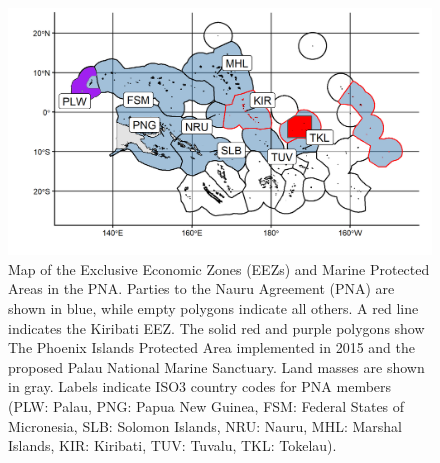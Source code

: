 \documentclass[12pt]{article}
\begin{document}
\begin{figure}
\centering
\includegraphics{img/PNA_map.png}
\caption{\label{fig:PNA_map}Map of the Exclusive Economic Zones (EEZs) and Marine Protected Areas in the PNA. Parties to the Nauru Agreement (PNA) are shown in blue, while empty polygons indicate all others. A red line indicates the Kiribati EEZ. The solid red and purple polygons show The Phoenix Islands Protected Area implemented in 2015 and the proposed Palau National Marine Sanctuary. Land masses are shown in gray. Labels indicate ISO3 country codes for PNA members (PLW: Palau, PNG: Papua New Guinea, FSM: Federal States of Micronesia, SLB: Solomon Islands, NRU: Nauru, MHL: Marshal Islands, KIR: Kiribati, TUV: Tuvalu, TKL: Tokelau).}
\end{figure}
\end{document}
